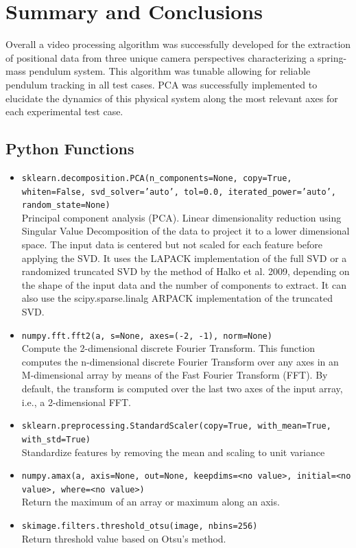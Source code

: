 \documentclass{article}
\begin{document}
\section{Summary and Conclusions}
Overall a video processing algorithm was successfully developed for the extraction of positional data from three unique camera perspectives characterizing a spring-mass pendulum system. This algorithm was tunable allowing for reliable pendulum tracking in all test cases. PCA was successfully implemented to elucidate the dynamics of this physical system along the most relevant axes for each experimental test case.
\printbibliography

\begin{appendices}

\section{Python Functions}
\begin{itemize}
    \item \texttt{sklearn.decomposition.PCA(n\_components=None, copy=True, whiten=False, svd\_solver='auto', tol=0.0, iterated\_power='auto', random\_state=None)}\\ 
    Principal component analysis (PCA). Linear dimensionality reduction using Singular Value Decomposition of the data to project it to a lower dimensional space. The input data is centered but not scaled for each feature before applying the SVD. It uses the LAPACK implementation of the full SVD or a randomized truncated SVD by the method of Halko et al. 2009, depending on the shape of the input data and the number of components to extract. It can also use the scipy.sparse.linalg ARPACK implementation of the truncated SVD.
    \item \texttt{numpy.fft.fft2(a, s=None, axes=(-2, -1), norm=None)}\\ Compute the 2-dimensional discrete Fourier Transform.
    This function computes the n-dimensional discrete Fourier Transform over any axes in an M-dimensional array by means of the Fast Fourier Transform (FFT). By default, the transform is computed over the last two axes of the input array, i.e., a 2-dimensional FFT.
    \item \texttt{sklearn.preprocessing.StandardScaler(copy=True, with\_mean=True, with\_std=True)} \\
    Standardize features by removing the mean and scaling to unit variance
    \item \texttt{numpy.amax(a, axis=None, out=None, keepdims=<no value>, initial=<no value>, where=<no value>)} \\
    Return the maximum of an array or maximum along an axis.
    \item \texttt{skimage.filters.threshold\_otsu(image, nbins=256)}\\ Return threshold value based on Otsu’s method.
    

\end{itemize}
\end{appendices}
\end{document}
